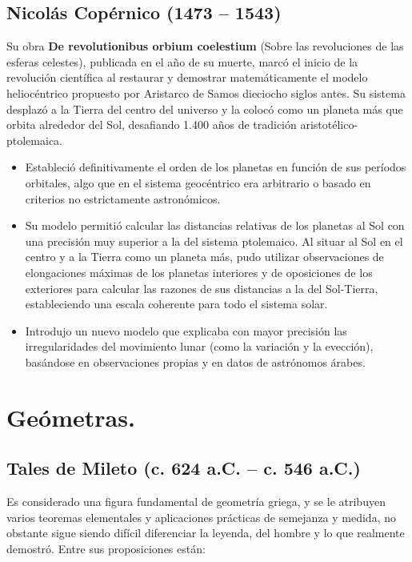 \documentclass[a4paper,12pt]{article} %
\begin{document}
\subsection{ Nicolás Copérnico (1473 -- 1543)}

\begin{justify}
	Su obra \textbf{De revolutionibus orbium coelestium} (Sobre las revoluciones de las esferas celestes), 
	publicada en el año de su muerte, marcó el inicio de la revolución científica al restaurar y 
	demostrar matemáticamente el modelo heliocéntrico propuesto por Aristarco de Samos dieciocho siglos antes. 
	Su sistema desplazó a la Tierra del centro del universo y la colocó como un planeta más que orbita alrededor del Sol, 
	desafiando 1.400 años de tradición aristotélico-ptolemaica.
\end{justify}

\begin{justify}
	\begin{itemize}
		\item Estableció definitivamente el orden de los planetas en función de sus períodos orbitales, algo que en el sistema geocéntrico era arbitrario o basado en criterios no estrictamente astronómicos. 
		\item Su modelo permitió calcular las distancias relativas de los planetas al Sol con una precisión muy superior a la del sistema ptolemaico. Al situar al Sol en el centro y a la Tierra como un planeta más, 
		pudo utilizar observaciones de elongaciones máximas de los planetas interiores y de oposiciones de los exteriores para calcular las razones de sus distancias a la del Sol-Tierra, estableciendo una escala coherente para todo el sistema solar.
		\item Introdujo un nuevo modelo que explicaba con mayor precisión las irregularidades del movimiento lunar (como la variación y la evección), basándose en observaciones propias y en datos de astrónomos árabes. 
	\end{itemize}
\end{justify}

\newpage

\section{Geómetras.}
\vspace{\baselineskip}
\vspace{\baselineskip}


\subsection{Tales de Mileto (c. 624 a.C. -- c. 546 a.C.)}
\begin{justify}
	Es considerado una figura
	fundamental de geometría griega, y se le atribuyen varios teoremas elementales y aplicaciones
	prácticas de semejanza y medida, no obstante sigue siendo difícil diferenciar la leyenda, del hombre
	y lo que realmente demostró.
	Entre sus proposiciones están:
\end{justify}
\end{document}
